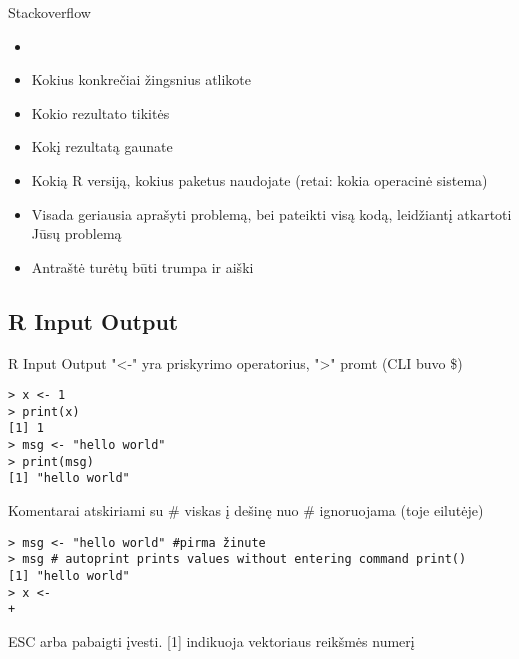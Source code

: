 \documentclass[11pt,xcolor=table]{beamer}
\begin{document}
\begin{frame}{Stackoverflow}
\begin{itemize}
\item \href{https://stackoverflow.com/}{\color{blue}{https://stackoverflow.com/}}
\item Kokius konkrečiai žingsnius atlikote
\item Kokio rezultato tikitės
\item Kokį rezultatą gaunate
\item Kokią R versiją, kokius paketus naudojate (retai: kokia operacinė sistema)
\item Visada geriausia aprašyti problemą, bei pateikti visą kodą, leidžiantį atkartoti Jūsų problemą
\item Antraštė turėtų būti trumpa ir aiški
\end{itemize}
\end{frame}

\subsection{R Input Output}


\begin{frame}[fragile]{R Input Output}
"<-" yra priskyrimo operatorius, ">" promt (CLI buvo \$)
\begin{lstlisting}
> x <- 1
> print(x)
[1] 1
> msg <- "hello world"
> print(msg)
[1] "hello world"
\end{lstlisting}

Komentarai atskiriami su \# viskas į dešinę nuo \# ignoruojama (toje eilutėje)
\begin{lstlisting}
> msg <- "hello world" #pirma žinute
> msg # autoprint prints values without entering command print()
[1] "hello world"
> x <- 
+ 
\end{lstlisting}
ESC arba pabaigti įvesti. [1] indikuoja vektoriaus reikšmės numerį
\end{frame}
\end{document}
